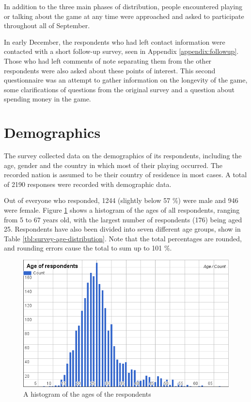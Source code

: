 In addition to the three main phases of distribution, people encountered playing or talking about the game at any time were approached and asked to participate throughout all of September.

In early December, the respondents who had left contact information were contacted with a short follow-up survey, seen in Appendix \ref{appendix:followup}. Those who had left comments of note separating them from the other respondents were also asked about these points of interest. This second questionnaire was an attempt to gather information on the longevity of the game, some clarifications of questions from the original survey and a question about spending money in the game. 


\section{Demographics}
\label{sec:player-study-demographics}

The survey collected data on the demographics of its respondents, including the age, gender and the country in which most of their playing occurred. The recorded nation is assumed to be their country of residence in most cases. A total of 2190 responses were recorded with demographic data.

Out of everyone who responded, 1244 (slightly below 57 \%) were male and 946 were female. Figure \ref{fig:respondents-age-histogram} shows a histogram of the ages of all respondents, ranging from 5 to 67 years old, with the largest number of respondents (176) being aged 25. Respondents have also been divided into seven different age groups, show in Table \ref{tbl:survey-age-distribution}. Note that the total percentages are rounded, and rounding errors cause the total to sum up to 101 \%.

\begin{figure}[h]
	\centering
	\includegraphics[width=\textwidth]{Figures/age-histogram}
	\caption{A histogram of the ages of the respondents}
	\label{fig:respondents-age-histogram}
\end{figure}

